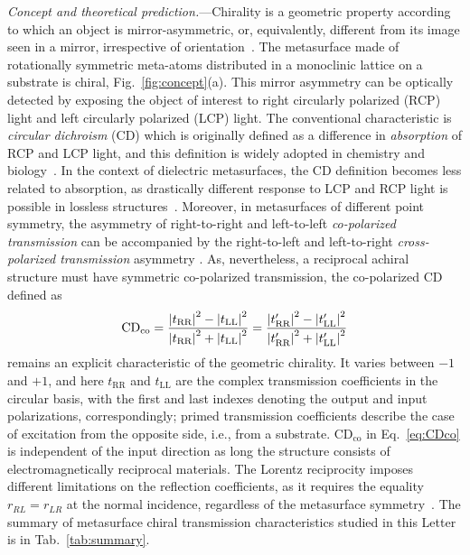 \documentclass[
    reprint,
    superscriptaddress,
    a4paper,
    amsmath,amssymb,
    prl,
]{revtex4-2}
\begin{document}
\textit{Concept and theoretical prediction.}---Chirality is a geometric property according to which an object is mirror-asymmetric, or, equivalently, different from its image seen in a mirror, irrespective of orientation~\cite{Caloz2020Feb}.
The metasurface made of rotationally symmetric meta-atoms distributed in a monoclinic lattice on a substrate is chiral, Fig.~\ref{fig:concept}{(a)}.
This mirror asymmetry can be optically detected by exposing the object of interest to right circularly polarized (RCP) light and left circularly polarized (LCP) light.
The conventional characteristic is \textit{circular dichroism} (CD) which is originally defined as a difference in \textit{absorption} of RCP and LCP light, and this definition is widely adopted in chemistry and biology~\cite{fasman2013circular,Kobayashi2011Nov,Baase1979Feb}. 
In the context of dielectric metasurfaces, the CD definition becomes less related to absorption, as drastically different response to LCP and RCP light is possible in lossless structures~\cite{Hu2017Jan,Gorkunov2020Aug,Kim2020Aug}.
Moreover, in metasurfaces of different point symmetry, the asymmetry of right-to-right and left-to-left \textit{co-polarized transmission} can be accompanied by the right-to-left  and left-to-right \textit{cross-polarized transmission} 
asymmetry \cite{Koshelev2024JOPT}. 
As, nevertheless, a reciprocal achiral structure must have symmetric co-polarized  transmission, the co-polarized CD defined as
\begin{equation}
    \mathrm{CD}_{\text{co}} = \frac{\abs{t_{\text{RR}}}^2 - \abs{t_{\text{LL}}}^2}{\abs{t_{\text{RR}}}^2 + \abs{t_{\text{LL}}}^2} = \frac{\abs{t^{\prime}_{\text{RR}}}^2 - \abs{t^{\prime}_{\text{LL}}}^2}{\abs{t^{\prime}_{\text{RR}}}^2 + \abs{t^{\prime}_{\text{LL}}}^2}
    \label{eq:CDco}
\end{equation}
remains an explicit characteristic of the geometric chirality. 
It varies between $-1$ and $+1$, and here $t_{\text{RR}}$ and $t_{\text{LL}}$ are the complex transmission coefficients in the circular basis, with the first and last indexes denoting the output and input polarizations, correspondingly; primed transmission coefficients describe the case of excitation from the opposite side, i.e., from a substrate.
$\mathrm{CD}_{\text{co}}$ in Eq.~\eqref{eq:CDco} is independent of the input direction as long the structure consists of electromagnetically reciprocal materials. 
The Lorentz reciprocity imposes different limitations on the reflection coefficients, as it requires the equality $r_{RL}=r_{LR}$ at the normal incidence, regardless of the metasurface symmetry~\cite{Koshelev2024JOPT,Gorkunov2024}. 
The summary of metasurface chiral transmission characteristics studied in this Letter is in Tab.~\ref{tab:summary}.
\end{document}
